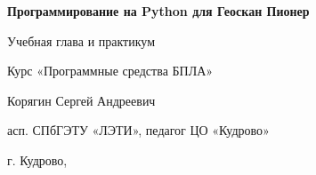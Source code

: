 \documentclass[14pt,a4paper]{extarticle}
\begin{document}
\begin{titlepage}
\centering
{\LARGE\bfseries Программирование на Python для Геоскан Пионер\par}
\vspace{0.8cm}
{\large Учебная глава и практикум\par}
\vspace{1.2cm}
{\large Курс «Программные средства БПЛА»\par}
\vfill
{\large Корягин Сергей Андреевич\par}
{\normalsize асп. СПбГЭТУ «ЛЭТИ», педагог ЦО «Кудрово»\par}
\vfill
{\large г. Кудрово, \the\year\par}
\end{titlepage}
\tableofcontents
\clearpage

\clearpage

\clearpage

\clearpage

\clearpage

\clearpage

\clearpage

\clearpage

\clearpage

\clearpage

\clearpage

\clearpage

\clearpage
\printbibliography
\end{document}
